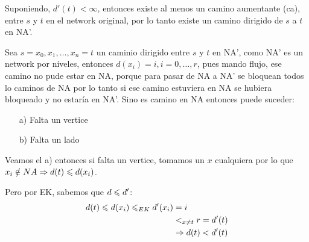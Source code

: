 \documentclass[12pt,a4paper]{article}
\begin{document}
Suponiendo, $d'(t) < \infty$, entonces existe al menos un camino aumentante (ca), 
entre $s$ y $t$ en el network original, por lo tanto existe un camino dirigido de 
$s$ a $t$ en NA'.
\medskip

Sea $s=x_{0},x_{1},\ldots,x_{n}=t$ un caminio dirigido entre $s$ y $t$ en NA', 
como NA' es un network por niveles, entonces $d(x_{i}) = i, i=0,\ldots,r$, pues 
mando flujo, ese camino no pude estar en NA, porque para pasar de NA a NA' se 
bloquean todos lo caminos de NA por lo tanto si ese camino estuviera en NA se 
hubiera bloqueado y no estaría en NA'. Sino es camino en NA entonces puede suceder:
\begin{itemize}
    \item [a)] Falta un vertice 
    \item [b)] Falta un lado
\end{itemize}

Veamos el a) entonces si falta un vertice, tomamos un $x$ cualquiera por 
lo que $x_{i} \notin NA \Rightarrow d(t) \leqslant d(x_{i})$.
\medskip

Pero por EK, sabemos que $d \leqslant d'$:
\begin{align*}
    d(t) \leqslant d(x_{i}) \leqslant_{EK} d'(x_{i}) &= i\\
    &<_{x\neq t} r = d'(t)\\
    &\Rightarrow d(t) < d'(t)
\end{align*}
\end{document}
